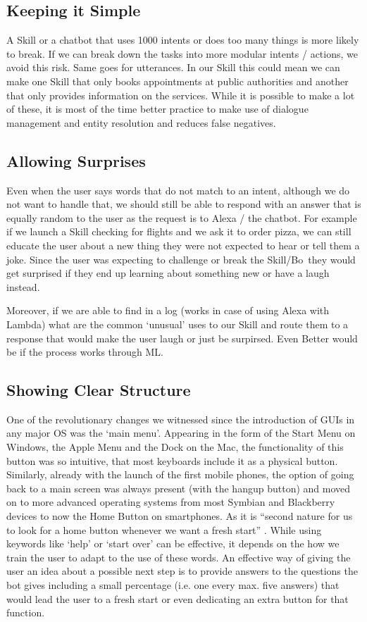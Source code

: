 \subsection*{Keeping it Simple}

A Skill or a chatbot that uses 1000 intents or does too many things is more likely to break. If we can break down the tasks into more modular intents / actions, we avoid this risk. Same goes for utterances. In our Skill this could mean we can make one Skill that only books appointments at public authorities and another that only provides information on the services. While it is possible to make a lot of these, it is most of the time better practice to make use of dialogue management and entity resolution and reduces false negatives.


\subsection*{Allowing Surprises}
Even when the user says words that do not match to an intent, although we do not want to handle that, we should still be able to respond with an answer that is equally random to the user as the request is to Alexa / the chatbot. For example if we launch a Skill checking for flights and we ask it to order pizza, we can still educate the user about a new thing they were not expected to hear or tell them a joke. Since the user was expecting to challenge or break the Skill/Bo\, they would get surprised if they end up learning about something new or have a laugh instead.

Moreover, if we are able to find in a log (works in case of using Alexa with Lambda) what are the common `unusual' uses to our Skill and route them to a response that would make the user laugh or just be surpirsed. Even Better would be if the process works through ML.


\subsection*{Showing Clear Structure}
One of the revolutionary changes we witnessed since the introduction of GUIs in any major OS was the `main menu'. Appearing in the form of the Start Menu on Windows, the Apple Menu and the Dock on the Mac, the functionality of this button was so intuitive, that most keyboards include it as a physical button. Similarly, already with the launch of the first mobile phones, the option of going back to a main screen was always present (with the hangup button) and moved on to more advanced operating systems from most Symbian and Blackberry devices to now the Home Button on smartphones. As it is ``second nature for us to look for a home button whenever we want a fresh start'' \cite{uxbot}. While using keywords like `help' or `start over' can be effective, it depends on the how we train the user to adapt to the use of these words.
An effective way of giving the user an idea about a possible next step is to provide answers to the questions the bot gives including a small percentage (i.e. one every max. five answers) that would lead the user to a fresh start or even dedicating an extra button for that function.
\\


